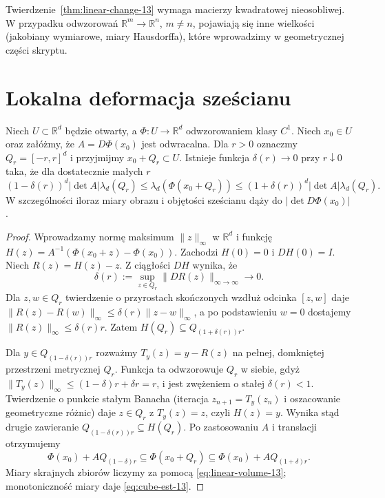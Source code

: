 \begin{uwaga}
Twierdzenie~\ref{thm:linear-change-13} wymaga
macierzy kwadratowej nieosobliwej. W przypadku odwzorowań
$\mathbb R^m\to\mathbb R^n$, $m\ne n$, pojawiają się
inne wielkości (jakobiany wymiarowe, miary Hausdorffa),
które wprowadzimy w geometrycznej części skryptu.
\end{uwaga}

\section{Lokalna deformacja sześcianu}

\begin{lemat}
\label{lem:small-cube-13}
Niech $U\subset\mathbb R^d$ będzie otwarty, a
$\Phi:U\to\mathbb R^d$ odwzorowaniem klasy $C^1$.
Niech $x_0\in U$ oraz załóżmy, że
$A=D\Phi(x_0)$ jest odwracalna.
Dla $r>0$ oznaczmy $Q_r=[-r,r]^d$ i przyjmijmy
$x_0+Q_r\subset U$. Istnieje funkcja $\delta(r)\to0$
przy $r\downarrow0$ taka, że dla dostatecznie małych $r$
\begin{equation}\label{eq:cube-est-13}
(1-\delta(r))^d|\det A|\lambda_d(Q_r)
\le \lambda_d(\Phi(x_0+Q_r))
\le(1+\delta(r))^d|\det A|\lambda_d(Q_r).
\end{equation}
W szczególności iloraz miary obrazu i objętości sześcianu
dąży do $|\det D\Phi(x_0)|$.
\end{lemat}
\begin{proof}
Wprowadzamy normę maksimum $\|z\|_\infty$ w $\mathbb R^d$
i funkcję $H(z)=A^{-1}(\Phi(x_0+z)-\Phi(x_0))$.
Zachodzi $H(0)=0$ i $DH(0)=I$.
Niech $R(z)=H(z)-z$. Z ciągłości $DH$ wynika, że
\[
\delta(r):=\sup_{z\in Q_r}\|DR(z)\|_{\infty\to\infty}
\longrightarrow0.
\]
Dla $z,w\in Q_r$ twierdzenie o przyrostach skończonych
wzdłuż odcinka $[z,w]$ daje
$\|R(z)-R(w)\|_\infty\le\delta(r)\|z-w\|_\infty$,
a po podstawieniu $w=0$ dostajemy
$\|R(z)\|_\infty\le\delta(r)r$.
Zatem $H(Q_r)\subseteq Q_{(1+\delta(r))r}$.

Dla $y\in Q_{(1-\delta(r))r}$ rozważmy
$T_y(z)=y-R(z)$ na pełnej, domkniętej przestrzeni
metrycznej $Q_r$. Funkcja ta odwzorowuje $Q_r$ w siebie,
gdyż $\|T_y(z)\|_\infty\le(1-\delta)r+\delta r=r$,
i jest zwężeniem o stałej $\delta(r)<1$.
Twierdzenie o punkcie stałym Banacha (iteracja
$z_{n+1}=T_y(z_n)$ i oszacowanie geometryczne różnic)
daje $z\in Q_r$ z $T_y(z)=z$, czyli $H(z)=y$.
Wynika stąd drugie zawieranie
$Q_{(1-\delta(r))r}\subseteq H(Q_r)$.
Po zastosowaniu $A$ i translacji otrzymujemy
\[
\Phi(x_0)+A Q_{(1-\delta)r}
\subseteq\Phi(x_0+Q_r)
\subseteq\Phi(x_0)+A Q_{(1+\delta)r}.
\]
Miary skrajnych zbiorów liczymy za pomocą
\eqref{eq:linear-volume-13}; monotoniczność miary
daje \eqref{eq:cube-est-13}.
\end{proof}

